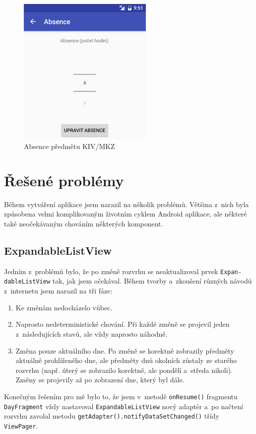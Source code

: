 \documentclass[12pt, a4paper]{article}
\begin{document}
		\begin{figure}[ht!]
			\centering
			\caption{Absence předmětu KIV/MKZ}
			\label{absences}
			\includegraphics[width=6.5cm]{img/absences.png}
		\end{figure}
		\FloatBarrier
	
	\section{Řešené problémy}
	Během vytváření aplikace jsem narazil na několik problémů. Většina z~nich byla způsobena velmi komplikovaným životním cyklem Android aplikace, ale některé také neočekávaným chováním některých komponent.
	
		\subsection{ExpandableListView}
		Jedním z~problémů bylo, že po změně rozvrhu se neaktualizoval prvek \texttt{Expan-\\dableListView} tak, jak jsem očekával. Během tvorby a~zkoušení různých návodů z~internetu jsem narazil na tři fáze:
			\begin{enumerate}
				\item Ke změnám nedocházelo vůbec.
				\item Naprosto nedeterministické chování. Při každé změně se projevil jeden z~následujících stavů, ale vždy naprosto náhodně.
				\item Změna pouze aktuálního dne. Po změně se korektně zobrazily předměty aktuálně prohlíženého dne, ale předměty dnů okolních zůstaly ze starého rozvrhu (např. úterý se zobrazilo korektně, ale pondělí a~středa nikoli). Změny se projevily až po zobrazení dne, který byl  dále.
			\end{enumerate}
		Konečným řešením pro mě bylo to, že jsem v~metodě \texttt{onResume()} fragmentu \texttt{DayFragment} vždy nastavoval \texttt{ExpandableListView} nový adaptér a~po načtení rozvrhu zavolal metodu \texttt{getAdapter().notifyDataSetChanged()} třídy \texttt{ViewPager}.
		
\end{document}
